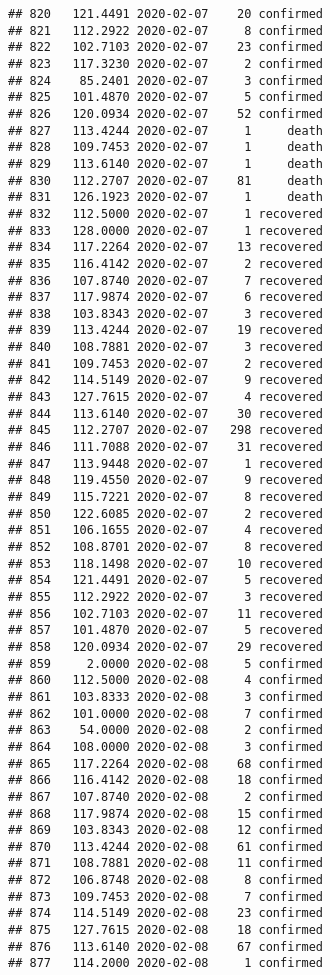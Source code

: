 \documentclass[
]{article}
\begin{document}
\begin{verbatim}
## 820   121.4491 2020-02-07    20 confirmed
## 821   112.2922 2020-02-07     8 confirmed
## 822   102.7103 2020-02-07    23 confirmed
## 823   117.3230 2020-02-07     2 confirmed
## 824    85.2401 2020-02-07     3 confirmed
## 825   101.4870 2020-02-07     5 confirmed
## 826   120.0934 2020-02-07    52 confirmed
## 827   113.4244 2020-02-07     1     death
## 828   109.7453 2020-02-07     1     death
## 829   113.6140 2020-02-07     1     death
## 830   112.2707 2020-02-07    81     death
## 831   126.1923 2020-02-07     1     death
## 832   112.5000 2020-02-07     1 recovered
## 833   128.0000 2020-02-07     1 recovered
## 834   117.2264 2020-02-07    13 recovered
## 835   116.4142 2020-02-07     2 recovered
## 836   107.8740 2020-02-07     7 recovered
## 837   117.9874 2020-02-07     6 recovered
## 838   103.8343 2020-02-07     3 recovered
## 839   113.4244 2020-02-07    19 recovered
## 840   108.7881 2020-02-07     3 recovered
## 841   109.7453 2020-02-07     2 recovered
## 842   114.5149 2020-02-07     9 recovered
## 843   127.7615 2020-02-07     4 recovered
## 844   113.6140 2020-02-07    30 recovered
## 845   112.2707 2020-02-07   298 recovered
## 846   111.7088 2020-02-07    31 recovered
## 847   113.9448 2020-02-07     1 recovered
## 848   119.4550 2020-02-07     9 recovered
## 849   115.7221 2020-02-07     8 recovered
## 850   122.6085 2020-02-07     2 recovered
## 851   106.1655 2020-02-07     4 recovered
## 852   108.8701 2020-02-07     8 recovered
## 853   118.1498 2020-02-07    10 recovered
## 854   121.4491 2020-02-07     5 recovered
## 855   112.2922 2020-02-07     3 recovered
## 856   102.7103 2020-02-07    11 recovered
## 857   101.4870 2020-02-07     5 recovered
## 858   120.0934 2020-02-07    29 recovered
## 859     2.0000 2020-02-08     5 confirmed
## 860   112.5000 2020-02-08     4 confirmed
## 861   103.8333 2020-02-08     3 confirmed
## 862   101.0000 2020-02-08     7 confirmed
## 863    54.0000 2020-02-08     2 confirmed
## 864   108.0000 2020-02-08     3 confirmed
## 865   117.2264 2020-02-08    68 confirmed
## 866   116.4142 2020-02-08    18 confirmed
## 867   107.8740 2020-02-08     2 confirmed
## 868   117.9874 2020-02-08    15 confirmed
## 869   103.8343 2020-02-08    12 confirmed
## 870   113.4244 2020-02-08    61 confirmed
## 871   108.7881 2020-02-08    11 confirmed
## 872   106.8748 2020-02-08     8 confirmed
## 873   109.7453 2020-02-08     7 confirmed
## 874   114.5149 2020-02-08    23 confirmed
## 875   127.7615 2020-02-08    18 confirmed
## 876   113.6140 2020-02-08    67 confirmed
## 877   114.2000 2020-02-08     1 confirmed

\end{verbatim}
\end{document}
